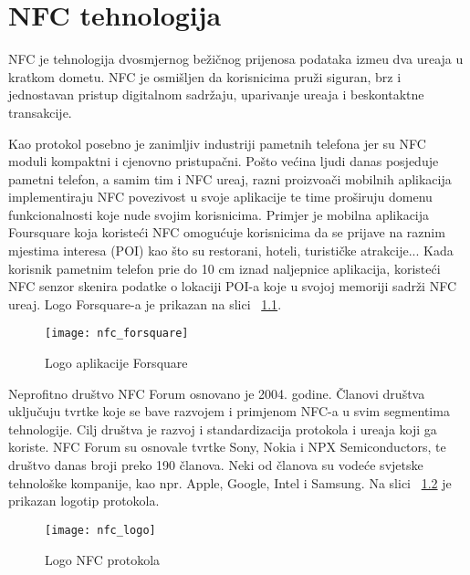 
\chapter{NFC tehnologija}
NFC je tehnologija dvosmjernog be\v{z}i\v{c}nog prijenosa podataka izme\dj u dva ure\dj aja u kratkom dometu. NFC je osmi\v{s}ljen da korisnicima pru\v{z}i siguran, brz i jednostavan pristup digitalnom sadr\v{z}aju, uparivanje ure\dj aja i beskontaktne transakcije.

Kao protokol posebno je zanimljiv industriji pametnih telefona jer su NFC moduli kompaktni i cjenovno pristupa\v{c}ni. Po\v{s}to ve\'{c}ina ljudi danas posjeduje pametni telefon, a samim tim i NFC ure\dj aj, razni proizvo\dj a\v{c}i mobilnih aplikacija implementiraju NFC povezivost u svoje aplikacije te time pro\v{s}iruju domenu funkcionalnosti koje nude svojim korisnicima. Primjer je mobilna aplikacija Foursquare \cite{foursquare} koja koriste\'{c}i NFC omogu\'{c}uje korisnicima da se prijave na raznim mjestima interesa (POI) kao \v{s}to su restorani, hoteli, turisti\v{c}ke atrakcije... Kada korisnik pametnim telefon pri\dj e do 10 cm iznad naljepnice aplikacija, koriste\'{c}i NFC senzor skenira podatke o lokaciji POI-a koje u svojoj memoriji sadr\v{z}i NFC ure\dj aj. Logo Forsquare-a je prikazan na slici  ~\ref{fig:forsquare}.

\begin{figure}[!htbp]
	\begin{center}
 \texttt{[image: nfc\_forsquare]}
 \caption{Logo aplikacije Forsquare}
 \label{fig:forsquare}
	\end{center}
\end{figure}

Neprofitno dru\v{s}tvo NFC Forum \cite{nfc_forum}  osnovano je 2004. godine. \v{C}lanovi dru\v{s}tva uklju\v{c}uju tvrtke koje se bave razvojem i primjenom NFC-a u svim segmentima tehnologije. Cilj dru\v{s}tva je razvoj i standardizacija protokola i ure\dj aja koji ga koriste. NFC Forum su osnovale tvrtke Sony, Nokia i NPX Semiconductors, te dru\v{s}tvo danas broji preko 190 \v{c}lanova. Neki od \v{c}lanova su vode\'{c}e svjetske tehnolo\v{s}ke kompanije, kao npr. Apple, Google, Intel i Samsung. Na slici  ~\ref{fig:nfc} je prikazan logotip protokola.

\begin{figure}[!htbp]
	\begin{center}
 \texttt{[image: nfc\_logo]}
 \caption{Logo NFC protokola}
 \label{fig:nfc}
	\end{center}
\end{figure}

